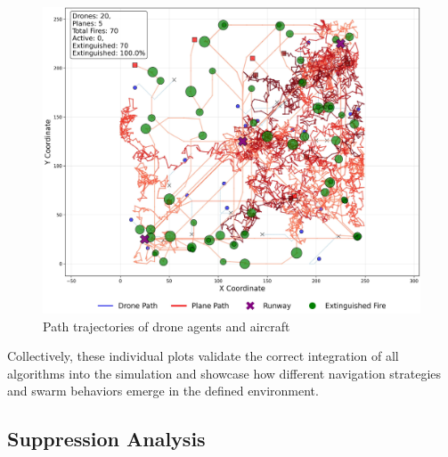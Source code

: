 \documentclass[11pt, a4paper]{article}
\begin{document}
\begin{figure}[htbp]
    \centering
    \includegraphics[width=1\linewidth]{figures/Hybrid_agent_paths.jpeg}
    \caption{Path trajectories of drone agents and aircraft}
    \label{fig:hybrid_path}
\end{figure}

Collectively, these individual plots validate the correct integration of all algorithms into the simulation and showcase how different navigation strategies and swarm behaviors emerge in the defined environment. 


\subsection{Suppression Analysis}
\label{sec:supression_analysis}
\end{document}
